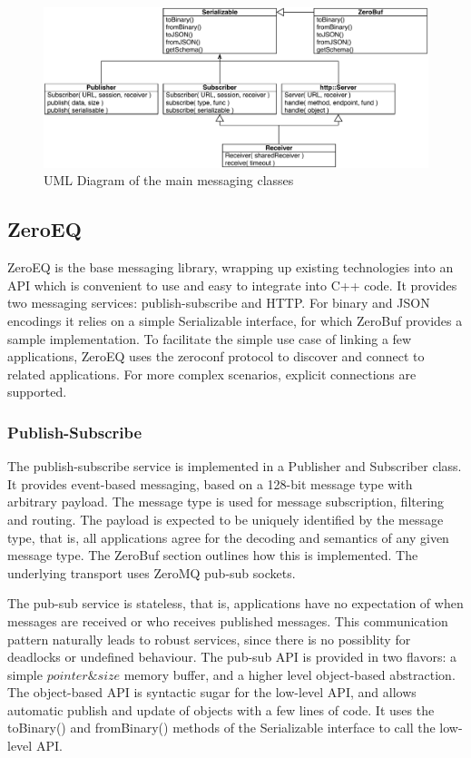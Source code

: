 \documentclass[10pt]{llncs}
\begin{document}
\begin{figure}[ht]\center
  \includegraphics[width=\columnwidth]{images/ZeroMS}
  \caption{\label{fUML}UML Diagram of the main messaging classes}
\end{figure}


\subsection{ZeroEQ}

ZeroEQ is the base messaging library, wrapping up existing technologies into an
API which is convenient to use and easy to integrate into C++ code. It provides
two messaging services: publish-subscribe and HTTP. For binary and JSON
encodings it relies on a simple \textsf{Serializable} interface, for which
ZeroBuf provides a sample implementation. To facilitate the simple use case of
linking a few applications, ZeroEQ uses the zeroconf protocol to discover and
connect to related applications. For more complex scenarios, explicit
connections are supported.

\subsubsection{Publish-Subscribe}

The publish-subscribe service is implemented in a \textsf{Publisher} and
\textsf{Subscriber} class. It provides event-based messaging, based on a 128-bit
message type with arbitrary payload. The message type is used for message
subscription, filtering and routing. The payload is expected to be uniquely
identified by the message type, that is, all applications agree for the decoding
and semantics of any given message type. The ZeroBuf section outlines how this
is implemented. The underlying transport uses ZeroMQ pub-sub sockets.

The pub-sub service is stateless, that is, applications have no expectation of
when messages are received or who receives published messages. This
communication pattern naturally leads to robust services, since there is no
possiblity for deadlocks or undefined behaviour. The pub-sub API is provided in
two flavors: a simple $pointer \& size$ memory buffer, and a higher level
object-based abstraction. The object-based API is syntactic sugar for the
low-level API, and allows automatic publish and update of objects with a few
lines of code. It uses the \textsf{toBinary()} and \textsf{fromBinary()} methods
of the \textsf{Serializable} interface to call the low-level API.
\end{document}
